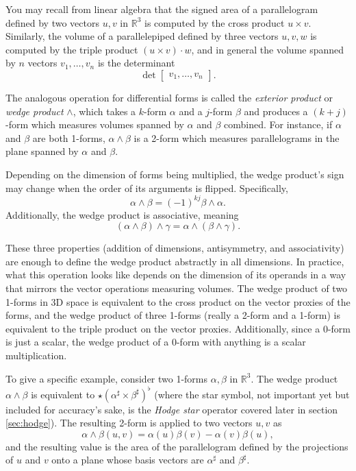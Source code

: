 \documentclass[utf8,english]{gradu3}
\begin{document}
You may recall from linear algebra that the signed area of a parallelogram
defined by two vectors $u,v$ in $\mathbb{R}^3$ is computed
by the cross product $u \times v$.
Similarly, the volume of a parallelepiped defined by three vectors $u,v,w$
is computed by the triple product $(u \times v) \cdot w$,
and in general the volume spanned by $n$ vectors $v_1, \dots, v_n$
is the determinant
\[
  \det \begin{bmatrix}
    v_1, \dots, v_n
  \end{bmatrix}.
\]

The analogous operation for differential forms is called the
\textit{exterior product} or \textit{wedge product} $\wedge$,
which takes a $k$-form $\alpha$ and a $j$-form $\beta$
and produces a $(k+j)$-form which measures volumes spanned by
$\alpha$ and $\beta$ combined.
For instance, if $\alpha$ and $\beta$ are both 1-forms,
$\alpha \wedge \beta$ is a 2-form which measures parallelograms
in the plane spanned by $\alpha$ and $\beta$.

Depending on the dimension of forms being multiplied,
the wedge product's sign may change
when the order of its arguments is flipped. Specifically,
\begin{equation}\label{eq:wedge_antisymmetry}
  \alpha \wedge \beta = (-1)^{kj} \beta \wedge \alpha.
\end{equation}
Additionally, the wedge product is associative, meaning
\begin{equation}
  (\alpha \wedge \beta) \wedge \gamma = \alpha \wedge (\beta \wedge \gamma).
\end{equation}

These three properties (addition of dimensions, antisymmetry, and associativity)
are enough to define the wedge product abstractly in all dimensions.
In practice, what this operation looks like depends on the dimension of its operands
in a way that mirrors the vector operations measuring volumes.
The wedge product of two 1-forms in 3D space
is equivalent to the cross product on the vector proxies of the forms,
and the wedge product of three 1-forms (really a 2-form and a 1-form)
is equivalent to the triple product on the vector proxies.
Additionally, since a 0-form is just a scalar,
the wedge product of a 0-form with anything is a scalar multiplication.

To give a specific example, consider two 1-forms $\alpha, \beta$ in $\mathbb{R}^3$.
The wedge product $\alpha \wedge \beta$
is equivalent to $\star(\alpha^{\sharp} \times \beta^{\sharp})^{\flat}$
(where the star symbol, not important yet but included for accuracy's sake,
is the \textit{Hodge star} operator covered later in section \ref{sec:hodge}).
The resulting 2-form is applied to two vectors $u,v$ as
\[
  \alpha \wedge \beta (u,v) = \alpha(u)\beta(v) - \alpha(v)\beta(u),
\]
and the resulting value is the area of the parallelogram
defined by the projections of $u$ and $v$
onto a plane whose basis vectors are $\alpha^{\sharp}$ and $\beta^{\sharp}$.
\end{document}

